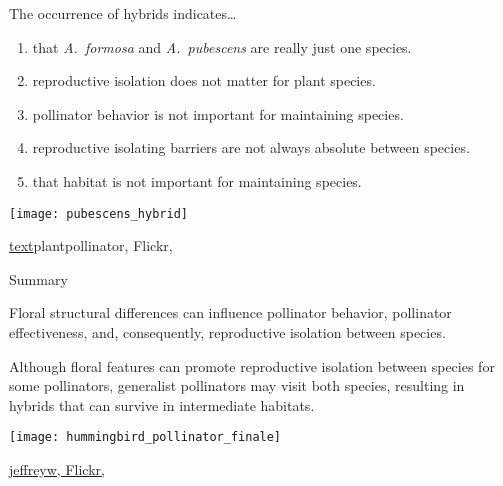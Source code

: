 \documentclass[t,handout]{beamer}  %
\newcommand{\ques}[1]{\highlight{\textsc{q#1:}}}
\begin{document}
%
\begin{frame}[t]{\ques{16} The occurrence of hybrids indicates\dots}
	
	\begin{multicols}{2}
	\begin{enumerate}
		\item that \textit{A.~formosa} and \textit{A.~pubescens} are really just one species.
		\item reproductive isolation does not matter for plant species.
		\item pollinator behavior is not important for maintaining species.
		\item reproductive isolating barriers are not always absolute between species.
		\item that habitat is not important for maintaining species.
	\end{enumerate}
	
	\columnbreak
	
		\texttt{[image: pubescens\_hybrid]}
	\end{multicols}
	
	\vfilll
	
	\hfill \tiny \href{https://www.flickr.com/photos/63093099@N02/32184751505/in/photolist-R34gjH}{text}plantpollinator, Flickr, 
\end{frame}
%
\begin{frame}[t]{Summary}
	
	\begin{multicols}{2}
	\hangpara Floral structural differences can influence pollinator behavior, pollinator effectiveness, and, consequently, reproductive isolation between species. 

	\hangpara Although floral features can promote reproductive isolation between species for some pollinators, generalist pollinators may visit both species, resulting in hybrids that can survive in intermediate habitats. 

	\columnbreak
	
		\texttt{[image: hummingbird\_pollinator\_finale]}
	\end{multicols}

	\vfilll
	
	\hfill \tiny \href{https://www.flickr.com/photos/jeffreyww/17421811000/in/photolist-egCnAb-W5cqTb-JmQo5J-NYPC2-7Tve9a-aCd9bM-7YoLY2-eeKix9-dhnGmv-nh85vv-sAP76s-6PkrUP-6r6qhK-driKBF-drdFtw-WS8wEY-drdwbv-7Ys1Pu-7YoLMx-egwBPz-9L5NHb-sqRuEw-sUo69r-9L5NHU-f9MG8d-RUtzU5-sxvkrJ-exZVce-sUcJns-rSeypr-oim7rn-drdzeb}{jeffreyw, Flickr, }
\end{frame}
%
\end{document}
